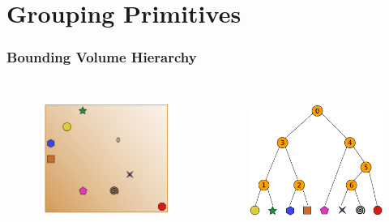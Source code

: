 \documentclass{beamer}
\begin{document}
\section{Grouping Primitives}

\begin{frame}
  \frametitle{Bounding Volume Hierarchy}
  
\begin{columns}[t]

\begin{figure}
\includegraphics[height=45mm]{build0.png}
\end{figure}

\begin{figure}
\includegraphics[height=45mm]{primitive_tree_narrow.png}
\end{figure}
\end{columns}
\end{frame}
\end{document}
